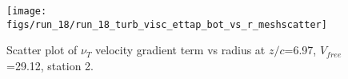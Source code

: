 \begin{figure}[H]
\centering
\texttt{[image: figs/run\_18/run\_18\_turb\_visc\_ettap\_bot\_vs\_r\_meshscatter]}
\caption{Scatter plot of $\nu_T$ velocity gradient term vs radius at $z/c$=6.97, $V_{free}$=29.12, station 2.}
\label{fig:run_18_turb_visc_ettap_bot_vs_r_meshscatter}
\end{figure}


